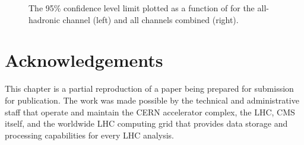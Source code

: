 \begin{figure}[htb]
    \centering
    \qquad
    \caption{The 95\% confidence level limit plotted as a function of \kVV for the all-hadronic channel (left) and all channels combined (right). 
    }
    \label{fig:vbsvvh_limit}
\end{figure}

\section{Acknowledgements}
This chapter is a partial reproduction of a paper being prepared for submission for publication. 
The work was made possible by the technical and administrative staff that operate and maintain the CERN accelerator complex, the LHC, CMS itself, and the worldwide LHC computing grid that provides data storage and processing capabilities for every LHC analysis. 
